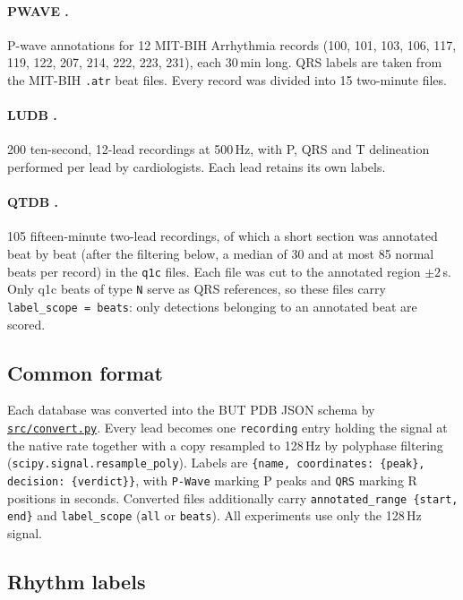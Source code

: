 \documentclass[11pt,a4paper]{article}
\newcommand{\code}[1]{\texttt{#1}}
\newcommand{\repourl}{https://github.com/BierschneiderEmanuel/pWaveDetection}
\newcommand{\repofile}[2]{\href{\repourl/blob/main/#2}{\code{#1}}}
\begin{document}
\paragraph{PWAVE \cite{pwave}.} P-wave annotations for 12 MIT-BIH Arrhythmia records \cite{mitbih} (100, 101, 103, 106, 117, 119, 122, 207, 214, 222, 223, 231), each 30\,min long. QRS labels are taken from the MIT-BIH \code{.atr} beat files. Every record was divided into 15 two-minute files.

\paragraph{LUDB \cite{ludb}.} 200 ten-second, 12-lead recordings at 500\,Hz, with P, QRS and T delineation performed per lead by cardiologists. Each lead retains its own labels.

\paragraph{QTDB \cite{qtdb}.} 105 fifteen-minute two-lead recordings, of which a short section was annotated beat by beat (after the filtering below, a median of 30 and at most 85 normal beats per record) in the \code{q1c} files. Each file was cut to the annotated region $\pm2$\,s. Only q1c beats of type \code{N} serve as QRS references, so these files carry \code{label\_scope = beats}: only detections belonging to an annotated beat are scored.

\subsection{Common format}

Each database was converted into the BUT PDB JSON schema by \repofile{src/convert.py}{src/convert.py}. Every lead becomes one \code{recording} entry holding the signal at the native rate together with a copy resampled to 128\,Hz by polyphase filtering (\code{scipy.signal.resample\_poly}).
Labels are \code{\{name, coordinates: \{peak\}, decision: \{verdict\}\}}, with \code{P-Wave} marking P peaks and \code{QRS} marking R positions in seconds. Converted files additionally carry \code{annotated\_range \{start, end\}} and \code{label\_scope} (\code{all} or \code{beats}). All experiments use only the 128\,Hz signal.

\subsection{Rhythm labels}
\label{sec:rhythmlabels}
\end{document}
